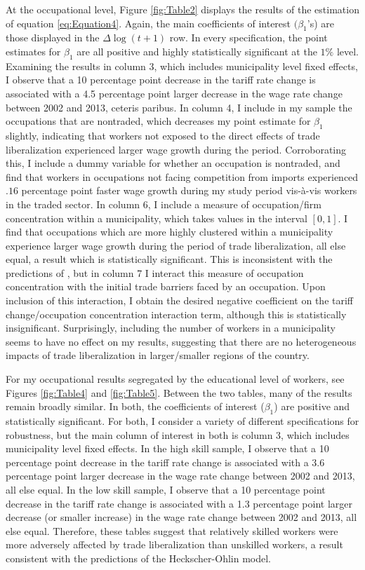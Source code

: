 At the occupational level, Figure \ref{fig:Table2} displays the results of the estimation of equation 
\ref{eq:Equation4}. Again, the main coefficients of interest $(\beta_1$'s) are those displayed in the 
$\Delta\log(t+1)$ row. In every specification, the point estimates for $\beta_1$ are all positive
and highly statistically significant at the $1\%$ level. Examining the results in column 3, which
includes municipality level fixed effects, I observe that a 10 percentage point decrease in the tariff 
rate change is associated with a 4.5 percentage point larger decrease in the wage rate change between 
2002 and 2013, ceteris paribus. In column 4, I include in my sample the occupations that are nontraded,
which decreases my point estimate for $\beta_1$ slightly, indicating that workers not exposed to 
the direct effects of trade liberalization experienced larger wage growth during the period. 
Corroborating
this, I include a dummy variable for whether an occupation is nontraded, and find that workers in
occupations not facing competition from imports experienced $.16$ percentage point faster wage growth
during my study period vis-\`{a}-vis workers in the traded sector. In column 6, I include a measure of occupation/firm concentration within a
municipality, which takes values in the interval $[0,1]$. I find that occupations which are more highly 
clustered within a municipality experience larger wage growth during the period of trade liberalization, 
all else equal, a result which is statistically significant. This is inconsistent with the 
predictions of \citet{holmes1}, but in column 7 I interact this measure
of occupation concentration with the initial trade barriers faced by an occupation.
Upon inclusion of this interaction, I obtain the desired negative coefficient on the tariff
change/occupation concentration interaction term, although this is statistically insignificant.
Surprisingly, including the number of workers in a municipality seems to have no effect on my
results, suggesting that there are no heterogeneous impacts of trade liberalization in larger/smaller
regions of the country.

For my occupational results segregated by the educational level of workers, see Figures \ref{fig:Table4}
and \ref{fig:Table5}. Between the two tables, many of the results remain broadly similar. In both,
the coefficients of interest ($\beta_1$) are positive and statistically significant. For both,
I consider a variety of different specifications for robustness, but the main column of interest
in both is column 3, which includes municipality level fixed effects. In the high skill sample,
I observe that a 10 percentage point decrease in the tariff 
rate change is associated with a 3.6 percentage point larger decrease in the wage rate change between 
2002 and 2013, all else equal. In the low skill sample,
I observe that a 10 percentage point decrease in the tariff 
rate change is associated with a 1.3 percentage point larger decrease (or smaller increase) 
in the wage rate change between 2002 and 2013, all else equal. Therefore, these tables suggest
that relatively skilled workers were more adversely affected by trade liberalization than unskilled
workers, a result consistent with the predictions of the Heckscher-Ohlin model.